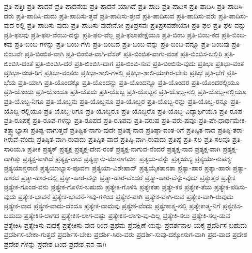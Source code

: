 {ಪ್ರತಿ-ಪತ್ತಿಃ
ಪ್ರತಿ-ಪಾದನೆ
ಪ್ರತಿ-ಪಾದನೆಯ
ಪ್ರತಿ-ಪಾದನೆ-ಯಾಗಿದೆ
ಪ್ರತಿ-ಪಾದಿ
ಪ್ರತಿ-ಪಾದಿಸ
ಪ್ರತಿ-ಪಾದಿಸಿ
ಪ್ರತಿ-ಪಾದಿಸಿ-ದರು
ಪ್ರತಿ-ಪಾದಿಸಿ-ದುದು
ಪ್ರತಿ-ಪಾದಿಸು-ತ್ತವೆ
ಪ್ರತಿ-ಪಾದಿಸು-ತ್ತೇವೆ
ಪ್ರತಿ-ಪಾದಿಸುವ
ಪ್ರತಿ-ಪಾದಿಸು-ವರು
ಪ್ರತಿ-ಪಾದಿಸು-ವುದ-ರಲ್ಲಿ
ಪ್ರತಿ-ಪಾದಿಸು-ವುದು
ಪ್ರತಿ-ಪಾದಿಸು-ವುದೇನೋ
ಪ್ರತಿಪ್ರಸವಃ
ಪ್ರತಿಪ್ರಸವಹೇಯಾಃ
ಪ್ರತಿ-ಫಲ
ಪ್ರತಿ-ಫಲ-ವನ್ನು
ಪ್ರತಿ-ಫಲವು
ಪ್ರತಿ-ಫಲ-ವೆಂಬು-ದನ್ನು
ಪ್ರತಿ-ಫಲ-ವೆಲ್ಲ
ಪ್ರತಿ-ಫಲಾಪೇಕ್ಷೆಯೂ
ಪ್ರತಿ-ಬಿಂಬ
ಪ್ರತಿ-ಬಿಂಬ-ಕದ
ಪ್ರತಿ-ಬಿಂಬ-ಕವು
ಪ್ರತಿ-ಬಿಂಬ-ಗಳನ್ನು
ಪ್ರತಿ-ಬಿಂಬ-ಗಳು
ಪ್ರತಿ-ಬಿಂಬದ
ಪ್ರತಿ-ಬಿಂಬ-ವನ್ನು
ಪ್ರತಿ-ಬಿಂಬ-ವನ್ನೂ
ಪ್ರತಿ-ಬಿಂಬವು
ಪ್ರತಿ-ಬಿಂಬವೇ
ಪ್ರತಿ-ಬಿಂಬಿತ-ವಾಗಿ
ಪ್ರತಿ-ಬಿಂಬಿತ-ವಾಗಿ-ವೆಸತ್
ಪ್ರತಿ-ಬಿಂಬಿತ-ವಾಗು-ವಂತೆ
ಪ್ರತಿ-ಬಿಂಬಿಸ-ಬಲ್ಲಿರಿ
ಪ್ರತಿ-ಬಿಂಬಿಸಿ-ದಂತೆ
ಪ್ರತಿ-ಬಿಂಬಿಸಿ-ದರೆ
ಪ್ರತಿ-ಬಿಂಬಿಸಿ-ದಾಗ
ಪ್ರತಿ-ಬಿಂಬಿ-ಸುವ
ಪ್ರತಿ-ಬಿಂಬಿಸು-ವುದು
ಪ್ರತಿಭಾ
ಪ್ರತಿಭಾ-ವಂತ
ಪ್ರತಿಭಾ-ವಂತ-ರಿಗೆ
ಪ್ರತಿಭಾ-ವಂತರು
ಪ್ರತಿಭಾ-ಶಾಲಿ-ಗಳಲ್ಲಿ
ಪ್ರತಿಭಾ-ಶಾಲಿ-ಯಾಗಿರ-ಬೇಕು
ಪ್ರತಿಭೆ
ಪ್ರತಿ-ಭೆಗೆ
ಪ್ರತಿ-ಭೆಯ
ಪ್ರತಿ-ಯಾಗಿ
ಪ್ರತಿ-ಯೊಂದಕ್ಕೂ
ಪ್ರತಿ-ಯೊಂದನ್ನು
ಪ್ರತಿ-ಯೊಂದನ್ನೂ
ಪ್ರತಿ-ಯೊಂದರ
ಪ್ರತಿ-ಯೊಂದರಲ್ಲಿಯೂ
ಪ್ರತಿ-ಯೊಂದು
ಪ್ರತಿ-ಯೊಂದೂ
ಪ್ರತಿ-ಯೊದು
ಪ್ರತಿ-ಯೊಬ್ಬ
ಪ್ರತಿ-ಯೊಬ್ಬನ
ಪ್ರತಿ-ಯೊಬ್ಬ-ನಲ್ಲಿ
ಪ್ರತಿ-ಯೊಬ್ಬ-ನಲ್ಲಿಯೂ
ಪ್ರತಿ-ಯೊಬ್ಬ-ನಿಗೂ
ಪ್ರತಿ-ಯೊಬ್ಬನು
ಪ್ರತಿ-ಯೊಬ್ಬನೂ
ಪ್ರತಿ-ಯೊಬ್ಬರ
ಪ್ರತಿ-ಯೊಬ್ಬ-ರನ್ನು
ಪ್ರತಿ-ಯೊಬ್ಬ-ರನ್ನೂ
ಪ್ರತಿ-ಯೊಬ್ಬ-ರಲ್ಲಿಯೂ
ಪ್ರತಿ-ಯೊಬ್ಬ-ರಿಗೂ
ಪ್ರತಿ-ಯೊಬ್ಬರೂ
ಪ್ರತಿ-ಯೊಬ್ಬರೊ
ಪ್ರತಿ-ಯೊಬ್ಬ-ವಿದ್ಯಾರ್ಥಿಯೂ
ಪ್ರತಿ-ರೂಪ
ಪ್ರತಿ-ರೂಪಕ್ಕೆ
ಪ್ರತಿ-ರೂಪ-ಗಳನ್ನು
ಪ್ರತಿ-ರೂಪದ
ಪ್ರತಿ-ರೂಪವು
ಪ್ರತಿ-ವರುಷ
ಪ್ರತಿ-ವರು-ಷವೂ
ಪ್ರತಿ-ಷೇ-ಧಾರ್ಥಮೇಕ-ತತ್ತ್ವಾಭ್ಯಾಸಃ
ಪ್ರತಿಷ್ಟ-ವಾಗುತ್ತದೆ
ಪ್ರತಿಷ್ಟಿತ-ನಾಗು-ವುದೇ
ಪ್ರತಿಷ್ಠ-ನಾದ
ಪ್ರತಿಷ್ಠಾ-ವಂತ-ರಿಗೆ
ಪ್ರತಿಷ್ಠಿತ-ನಾದ
ಪ್ರತಿಷ್ಠಿ-ತರಾ-ಗಿರುವೆ-ವೆಂದು
ಪ್ರತಿಷ್ಠಿತ-ವಾಗಿ-ರುವುದು
ಪ್ರತಿಷ್ಠಿತ-ವಾದ
ಪ್ರತಿಷ್ಠಿ-ವಾಗಿ-ರುವುದು
ಪ್ರತಿಷ್ಠೆ
ಪ್ರತಿ-ಸಲ
ಪ್ರತಿ-ಸಲವೂ
ಪ್ರತಿ-ಸಾರಿಯೂ
ಪ್ರತೀಕ
ಪ್ರತ್ಯಕ್
ಪ್ರತ್ಯಕ್ಷ
ಪ್ರತ್ಯಕ್ಷ-ದೇವ-ರಂತೆ
ಪ್ರತ್ಯಕ್ಷ-ನಾಗುವ-ನೆಂದರೆ
ಪ್ರತ್ಯಕ್ಷ-ನಾದ
ಪ್ರತ್ಯಕ್ಷ-ವಾಗಿ
ಪ್ರತ್ಯಕ್ಷ-ವಾಗಿತ್ತು
ಪ್ರತ್ಯಕ್ಷ-ವಾಗಿದೆ
ಪ್ರತ್ಯಕ್ಷ-ವಾದ
ಪ್ರತ್ಯಕ್ಷಾನು-ಮಾನಾಗಮಾಃ
ಪ್ರತ್ಯಯ-ವನ್ನು
ಪ್ರತ್ಯಯಸ್ಯ
ಪ್ರತ್ಯಯಾ-ನುಪಶ್ಯಃ
ಪ್ರತ್ಯಯಾನ್ತರಾಣಿ
ಪ್ರತ್ಯಯಾಭ್ಯಾಸ-ಪೂರ್ವಃ
ಪ್ರತ್ಯಯಾ-ವಿಶೇಷಾದ್
ಪ್ರತ್ಯಯೈಕತಾನತಾ
ಪ್ರತ್ಯಾ-ಹಾರ
ಪ್ರತ್ಯಾ-ಹಾರಃ
ಪ್ರತ್ಯಾ-ಹಾರದ
ಪ್ರತ್ಯಾ-ಹಾರ-ದಲ್ಲಿ
ಪ್ರತ್ಯಾ-ಹಾರ-ವನ್ನು
ಪ್ರತ್ಯಾ-ಹಾರ-ವೆಂದರೆ
ಪ್ರತ್ಯಾ-ಹಾರ-ವೆನ್ನು-ವುದು
ಪ್ರತ್ಯುತ್ತರ
ಪ್ರತ್ಯೇಕ
ಪ್ರತ್ಯೇಕ-ಗೊಂಡ-ವನು
ಪ್ರತ್ಯೇಕ-ಗೊಳಿಸ-ಬಹುದು
ಪ್ರತ್ಯೇಕ-ಗೊಳಿಸಿ
ಪ್ರತ್ಯೇಕತಾ
ಪ್ರತ್ಯೇ-ಕತೆ
ಪ್ರತ್ಯೇಕ-ತೆಯ
ಪ್ರತ್ಯೇಕ-ಪಡಿಸು-ವುದು
ಪ್ರತ್ಯೇಕ-ಭಾವನೆ
ಪ್ರತ್ಯೇಕ-ಭಾವನೆ-ಇವು-ಗಳಿಂದ
ಪ್ರತ್ಯೇಕ-ವಾಗಿ
ಪ್ರತ್ಯೇಕ-ವಾಗಿ-ರುವ
ಪ್ರತ್ಯೇಕ-ವಾಗಿ-ರುವುದು
ಪ್ರತ್ಯೇಕ-ವಾದ
ಪ್ರತ್ಯೇಕ-ವಾದು-ದೆಂದೂ
ಪ್ರತ್ಯೇಕ-ವಾದುವು
ಪ್ರತ್ಯೇಕ-ವೆಂದು
ಪ್ರತ್ಯೇಕಾತ್ಮ-ನಲ್ಲಿ
ಪ್ರತ್ಯೇಕಾತ್ಮ-ನಿಗೆ
ಪ್ರತ್ಯೇಕಿಸ-ಬಹುದು
ಪ್ರತ್ಯೇಕಿಸ-ಲಾಗದ
ಪ್ರತ್ಯೇಕಿಸ-ಲಾಗ-ದಷ್ಟು
ಪ್ರತ್ಯೇಕಿಸ-ಲಾಗು-ವು-ದಿಲ್ಲ
ಪ್ರತ್ಯೇಕಿ-ಸಲು
ಪ್ರತ್ಯೇಕಿ-ಸಲ್ಪ-ಡುವ
ಪ್ರತ್ಯೇಕಿಸಿ
ಪ್ರತ್ಯೇಕಿಸು-ವುದಕ್ಕೆ
ಪ್ರತ್ಯೇಕಿಸು-ವುದ-ರಿಂದ
ಪ್ರಥಮ
ಪ್ರದಕ್ಷಿಣೆ-ಯನ್ನು
ಪ್ರದರ್ಶನಾಲ-ಯಕ್ಕೆ
ಪ್ರದರ್ಶಿಸ-ಬಹುದು
ಪ್ರದರ್ಶಿಸ-ಬೇಕಾ-ಗುತ್ತದೆ
ಪ್ರದರ್ಶಿಸ-ಬೇಕು
ಪ್ರದರ್ಶಿ-ಸಿರು-ವರು
ಪ್ರದರ್ಶಿ-ಸುವು-ದಕ್ಕೋಸುಗ-ವಾಗಿ
ಪ್ರದ-ವಾದ
ಪ್ರದೇಶ
ಪ್ರದೇಶ-ಗಳನ್ನು
ಪ್ರದೇಶ-ದಿಂದ
ಪ್ರದೇಶ-ವನ-ನಾಗಿ
}
